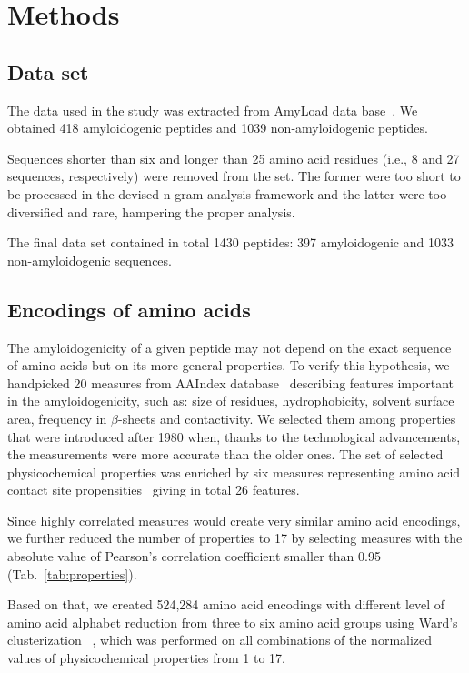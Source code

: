 \documentclass[a4,center,fleqn]{NAR}
\begin{document}
\section{Methods}
\subsection{Data set}

The data used in the study was extracted from AmyLoad data 
base~\citep{wozniak_amyload:_2015}. We obtained 418 
amyloidogenic peptides and 1039 non-amyloidogenic peptides.

  Sequences shorter than six and longer than 25 amino acid residues 
(i.e., 8 and 27 sequences, respectively) were 
removed from the set. The former were too short to be processed in the
devised n-gram analysis framework and the latter were too diversified and rare, 
hampering the proper analysis.

  The final data set contained in total 1430 peptides: 397 amyloidogenic 
and 1033 non-amyloidogenic sequences. 

\subsection{Encodings of amino acids}

The amyloidogenicity of a given peptide may not depend on the exact sequence of 
amino acids but on its more general properties. To verify this hypothesis, we 
handpicked 20 measures from AAIndex database~\citep{kawashima_aaindex:_2008} 
describing features important in the  amyloidogenicity, such as: size of residues, 
hydrophobicity, solvent surface area, frequency in $\beta$-sheets and contactivity. 
We selected them among properties that were introduced after 
1980 when, thanks to the technological advancements, the measurements were more 
accurate than the older ones. The set of selected physicochemical properties was
enriched by six measures representing amino acid contact site 
propensities~\cite{wozniak_characteristics_2014} giving in total 26 features.

  Since highly correlated measures would create very similar amino acid encodings, we further 
reduced the number of properties to 17 by selecting measures with the absolute value of 
Pearson's correlation coefficient smaller than 0.95 (Tab.~\ref{tab:properties}). 

  Based on that, we created 524,284 amino acid encodings 
with different level of amino acid alphabet reduction from three to six amino acid groups 
using Ward's clusterization ~\citep{joe_h._ward_jr_hierarchical_1963},  which was performed 
on all combinations of the normalized values of physicochemical properties from 1 to 17. 
\end{document}
